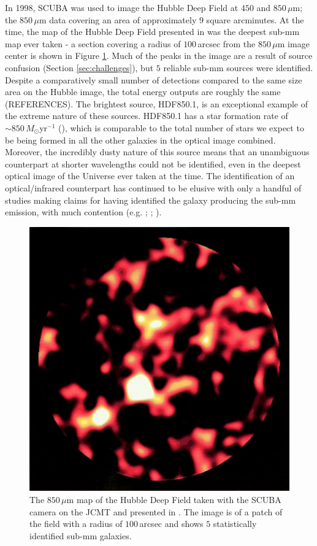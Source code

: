 In 1998, SCUBA was used to image the Hubble Deep Field at $450$ and $850\,\mu$m; the $850\,\mu$m data covering an area of approximately $9$ square arcminutes. At the time, the map of the Hubble Deep Field presented in \citealt{Hughes_1998} was the deepest sub-mm map ever taken - a section covering a radius of $100\,$arcsec from the $850\,\mu$m image center is shown in Figure \ref{fig:hubble_deep_field_scuba}. Much of the peaks in the image are a result of source confusion (Section \ref{sec:challenges}), but $5$ reliable sub-mm sources were identified. Despite a comparatively small number of detections compared to the same size area on the Hubble image, the total energy outputs are roughly the same ({\color{red}REFERENCES}). The brightest source, HDF850.1, is an exceptional example of the extreme nature of these sources. HDF850.1 has a star formation rate of $\sim 850\,M_\odot$yr$^{-1}$ (\citealt{Walter_2012}), which is comparable to the total number of stars we expect to be being formed in all the other galaxies in the optical image combined. Moreover, the incredibly dusty nature of this source means that an unambiguous counterpart at shorter wavelengths could not be identified, even in the deepest optical image of the Universe ever taken at the time. The identification of an optical/infrared counterpart has continued to be elusive with only a handful of studies making claims for having identified the galaxy producing the sub-mm emission, with much contention (e.g. \citealt{Dunlop_2004}; \citealt{Serjeant_2014}; \citealt{Sun_2023}).

\begin{figure}
    \centering
	\includegraphics[width=0.75\columnwidth]{Figures/hubble_deep_field_scuba.pdf}
	\caption[Hubble Deep Field as captured by SCUBA on the JCMT]{The $850\,\mu$m map of the Hubble Deep Field taken with the SCUBA camera on the JCMT and presented in \citealt{Hughes_1998}. The image is of a patch of the field with a radius of $100\,$arcsec and shows $5$ statistically identified sub-mm galaxies.}
	\label{fig:hubble_deep_field_scuba}
\end{figure}

